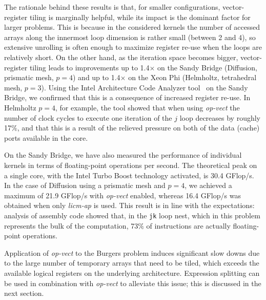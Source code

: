 \documentclass[conference]{IEEEtran}
\begin{document}
The rationale behind these results is that, for smaller configurations, vector-register tiling is marginally helpful, while its impact is the dominant factor for larger problems. This is because in the considered kernels the number of accessed arrays along the innermost loop dimension is rather small (between 2 and 4), so extensive unrolling is often enough to maximize register re-use when the loops are relatively short. On the other hand, as the iteration space becomes bigger, vector-register tiling leads to improvements up to 1.4$\times$ on the Sandy Bridge (Diffusion, prismatic mesh, $p=4$) and up to 1.4$\times$ on the Xeon Phi (Helmholtz, tetrahedral mesh, $p=3$). Using the Intel Architecture Code Analyzer tool~\cite{IACA} on the Sandy Bridge, we confirmed that this is a consequence of increased register re-use. In Helmholtz $p=4$, for example, the tool showed that when using \emph{op-vect} the number of clock cycles to execute one iteration of the $j$ loop decreases by roughly 17$\%$, and that this is a result of the relieved pressure on both of the data (cache) ports available in the core.

On the Sandy Bridge, we have also measured the performance of individual kernels in terms of floating-point operations per second. The theoretical peak on a single core, with the Intel Turbo Boost technology activated, is 30.4 GFlop/s. In the case of Diffusion using a prismatic mesh and $p=4$, we achieved a maximum of 21.9 GFlop/s with \emph{op-vect} enabled, whereas 16.4 GFlop/s was obtained when only \emph{licm-ap} is used. This result is in line with the expectations: analysis of assembly code showed that, in the \texttt{jk} loop nest, which in this problem represents the bulk of the computation, 73$\%$ of instructions are actually floating-point operations.

Application of \emph{op-vect} to the Burgers problem induces significant slow downs due to the large number of temporary arrays that need to be tiled, which exceeds the available logical registers on the underlying architecture. Expression splitting can be used in combination with \emph{op-vect} to alleviate this issue; this is discussed in the next section.
\end{document}
